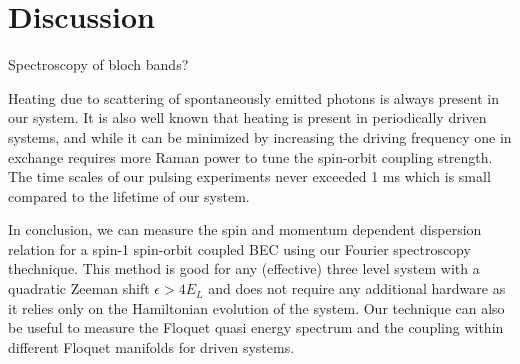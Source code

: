 \section{Discussion}


Spectroscopy of bloch bands?

Heating due to scattering of spontaneously emitted photons is always present in our system. It is also well known that heating is present in periodically driven systems, and while it can be minimized by increasing the driving frequency one in exchange requires more Raman power to tune the spin-orbit coupling strength. The time scales of our pulsing experiments never exceeded 1 ms which is small compared to the lifetime of our system.

In conclusion, we can measure the spin and momentum dependent dispersion relation for a spin-1 spin-orbit coupled BEC using our Fourier spectroscopy thechnique. This method is good for any (effective) three level system with a quadratic Zeeman shift $\epsilon>4E_L$ and does not require any additional hardware as it relies only on the Hamiltonian evolution of the system. Our technique can also be useful to measure the Floquet quasi energy spectrum and the coupling within different Floquet manifolds for driven systems. 